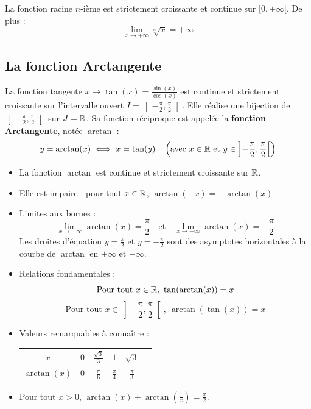 \begin{propriete}[Limites]
La fonction racine $n$-ième est strictement croissante et continue sur $[0, +\infty[$. De plus :
\[
\lim_{x \to +\infty} \sqrt[n]{x} = +\infty
\]
\end{propriete}

\subsection{La fonction Arctangente}

\begin{definition}
La fonction tangente $x \mapsto \tan(x) = \frac{\sin(x)}{\cos(x)}$ est continue et strictement croissante sur l'intervalle ouvert $I = \left]-\frac{\pi}{2}, \frac{\pi}{2}\right[$.
Elle réalise une bijection de $\left]-\frac{\pi}{2}, \frac{\pi}{2}\right[$ sur $J = \mathbb{R}$.
Sa fonction réciproque est appelée la \textbf{fonction Arctangente}, notée $\arctan$ :
\[
y = \arctan(x) \iff x = \tan(y) \quad \left(\text{avec } x \in \mathbb{R} \text{ et } y \in \left]-\frac{\pi}{2}, \frac{\pi}{2}\right[\right)
\]
\end{definition}

\begin{propriete}
\begin{itemize}
    \item La fonction $\arctan$ est continue et strictement croissante sur $\mathbb{R}$.
    \item Elle est impaire : pour tout $x \in \mathbb{R}$, $\arctan(-x) = -\arctan(x)$.
    \item Limites aux bornes :
    \[
    \lim_{x \to +\infty} \arctan(x) = \frac{\pi}{2} \quad \text{et} \quad \lim_{x \to -\infty} \arctan(x) = -\frac{\pi}{2}
    \]
    Les droites d'équation $y = \frac{\pi}{2}$ et $y = -\frac{\pi}{2}$ sont des asymptotes horizontales à la courbe de $\arctan$ en $+\infty$ et $-\infty$.
    \item Relations fondamentales :
    \[
    \text{Pour tout } x \in \mathbb{R}, \ \tan(\arctan(x)) = x
    \]
    \[
    \text{Pour tout } x \in \left]-\frac{\pi}{2}, \frac{\pi}{2}\right[, \ \arctan(\tan(x)) = x
    \]
    \item Valeurs remarquables à connaître :
    \begin{center}
    \renewcommand{\arraystretch}{1.5}
    \begin{tabular}{|c|c|c|c|c|c|}
    \hline
    $x$ & $0$ & $\frac{\sqrt{3}}{3}$ & $1$ & $\sqrt{3}$ \\
    \hline
    $\arctan(x)$ & $0$ & $\frac{\pi}{6}$ & $\frac{\pi}{4}$ & $\frac{\pi}{3}$ \\
    \hline
    \end{tabular}
    \end{center}
    \item Pour tout $x > 0$, $\arctan(x) + \arctan\left(\frac{1}{x}\right) = \frac{\pi}{2}$.
\end{itemize}
\end{propriete}

